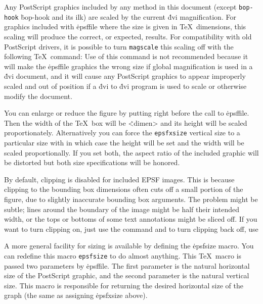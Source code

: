 Any PostScript graphics included by any method in this document (except
\^{{\tt bop-hook}}
\.{bop-hook} and its ilk) are scaled by the current \.{dvi} magnification.
For graphics included with \.{\ttbackslash epsffile} where the size is given
in \TeX\
dimensions, this scaling will produce the correct, or expected, results.
For compatibility with old PostScript drivers, it is possible to turn
\^{{\tt magscale}}
this scaling off with the following \TeX\ command:
\noindent
Use of this command is not recommended because it will make the
\.{\ttbackslash epsffile} graphics the wrong size if global
magnification is used
in a \.{dvi} document, and it will cause any PostScript graphics to
appear improperly scaled and out of position if a \.{dvi} to \.{dvi}
program is used to scale or otherwise modify the document.

You can enlarge or reduce the figure by putting
\noindent
right before the call to \.{\ttbackslash epsffile}.
Then the width of the \TeX\ box will be \.{<dimen>} and its
height will be scaled proportionately.	Alternatively you can force the
\^{{\tt epsfxsize}}
vertical size to a particular size with
\noindent
in which case the height will be set and the width will be scaled
proportionally.  If you set both, the aspect ratio of the included
graphic will be distorted but both size specifications will be
honored.

By default, clipping is disabled for included EPSF images.  This is
because clipping to the bounding box dimensions often cuts off a
small portion of the figure, due to slightly inaccurate bounding
box arguments.	The problem might be subtle; lines around the boundary
of the image might be half their intended width, or the tops or
bottoms of some text annotations might be sliced off.  If you want to
turn clipping on, just use the command
\noindent
and to turn clipping back off, use

A more general facility for sizing is available by defining the
\.{\ttbackslash epsfsize} macro.   You can redefine this macro
\^{{\tt epsfsize}}
to do almost anything.	This \TeX\ macro is passed two parameters
by \.{\ttbackslash epsffile}.  The first parameter is the natural
horizontal size of
the PostScript graphic, and the second parameter is the natural vertical
size.  This macro is responsible for returning the desired horizontal size of
the graph (the same as assigning \.{\ttbackslash epsfxsize} above).

